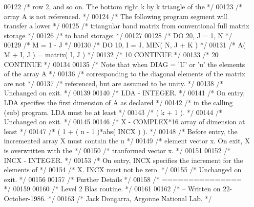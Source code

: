\begin{DoxyCode}
00122 \textcolor{comment}{/*           row 2, and so on. The bottom right k by k triangle of the */}
00123 \textcolor{comment}{/*           array A is not referenced. */}
00124 \textcolor{comment}{/*           The following program segment will transfer a lower */}
00125 \textcolor{comment}{/*           triangular band matrix from conventional full matrix storage */}
00126 \textcolor{comment}{/*           to band storage: */}
00127 
00128 \textcolor{comment}{/*                 DO 20, J = 1, N */}
00129 \textcolor{comment}{/*                    M = 1 - J */}
00130 \textcolor{comment}{/*                    DO 10, I = J, MIN( N, J + K ) */}
00131 \textcolor{comment}{/*                       A( M + I, J ) = matrix( I, J ) */}
00132 \textcolor{comment}{/*              10    CONTINUE */}
00133 \textcolor{comment}{/*              20 CONTINUE */}
00134 
00135 \textcolor{comment}{/*           Note that when DIAG = 'U' or 'u' the elements of the array A */}
00136 \textcolor{comment}{/*           corresponding to the diagonal elements of the matrix are not */}
00137 \textcolor{comment}{/*           referenced, but are assumed to be unity. */}
00138 \textcolor{comment}{/*           Unchanged on exit. */}
00139 
00140 \textcolor{comment}{/*  LDA    - INTEGER. */}
00141 \textcolor{comment}{/*           On entry, LDA specifies the first dimension of A as declared */}
00142 \textcolor{comment}{/*           in the calling (sub) program. LDA must be at least */}
00143 \textcolor{comment}{/*           ( k + 1 ). */}
00144 \textcolor{comment}{/*           Unchanged on exit. */}
00145 
00146 \textcolor{comment}{/*  X      - COMPLEX*16       array of dimension at least */}
00147 \textcolor{comment}{/*           ( 1 + ( n - 1 )*abs( INCX ) ). */}
00148 \textcolor{comment}{/*           Before entry, the incremented array X must contain the n */}
00149 \textcolor{comment}{/*           element vector x. On exit, X is overwritten with the */}
00150 \textcolor{comment}{/*           tranformed vector x. */}
00151 
00152 \textcolor{comment}{/*  INCX   - INTEGER. */}
00153 \textcolor{comment}{/*           On entry, INCX specifies the increment for the elements of */}
00154 \textcolor{comment}{/*           X. INCX must not be zero. */}
00155 \textcolor{comment}{/*           Unchanged on exit. */}
00156 
00157 \textcolor{comment}{/*  Further Details */}
00158 \textcolor{comment}{/*  =============== */}
00159 
00160 \textcolor{comment}{/*  Level 2 Blas routine. */}
00161 
00162 \textcolor{comment}{/*  -- Written on 22-October-1986. */}
00163 \textcolor{comment}{/*     Jack Dongarra, Argonne National Lab. */}

\end{DoxyCode}
